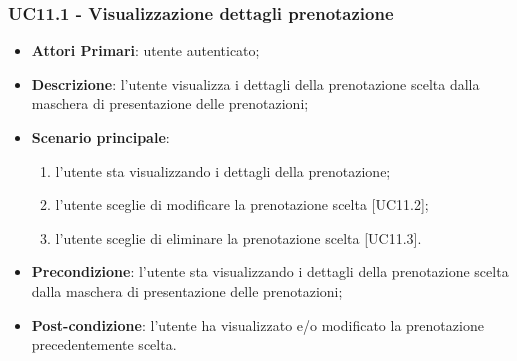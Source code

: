  \subsubsection{UC11.1 - Visualizzazione dettagli prenotazione}
\begin{itemize}
	\item \textbf{Attori Primari}: utente autenticato;
	\item \textbf{Descrizione}: l'utente visualizza i dettagli della prenotazione scelta dalla maschera di presentazione delle prenotazioni;
	\item \textbf{Scenario principale}:
	\begin{enumerate}[label=\alph*.]
		\item l'utente sta visualizzando i dettagli della prenotazione;
		\item l'utente sceglie di modificare la prenotazione scelta [UC11.2];
		\item l'utente sceglie di eliminare la prenotazione scelta [UC11.3].
	\end{enumerate}
	\item \textbf{Precondizione}: l'utente sta visualizzando i dettagli della prenotazione scelta dalla maschera di presentazione delle prenotazioni;
	\item \textbf{Post-condizione}: l'utente ha visualizzato e/o modificato la prenotazione precedentemente scelta.
\end{itemize}
\begin{comment}

\subsubsection{UC6.2 - Modifica di una prenotazione}
\begin{itemize}
	\item \textbf{Attori Primari}: utente autenticato;
	\item \textbf{Descrizione}: l'utente modifica uno o più dati della prenotazione selezionata;
	\item \textbf{Scenario principale}: l'utente si trova all'interno della pagina di modifica della prenotazione precedentemente selezionata;
	\item \textbf{Precondizione}: l'utente si trova nella pagina di presentazione di tutte le sue prenotazioni e ne ha selezionato una per la modifica, oppure l'utente si trova nella pagina di visualizzazione dettagli prenotazione e sceglie di modificare quest'ultima;
	\item \textbf{Post-condizione}: l'utente ha modificato uno o più dati della prenotazione selezionata.
\end{itemize}

\end{comment}
